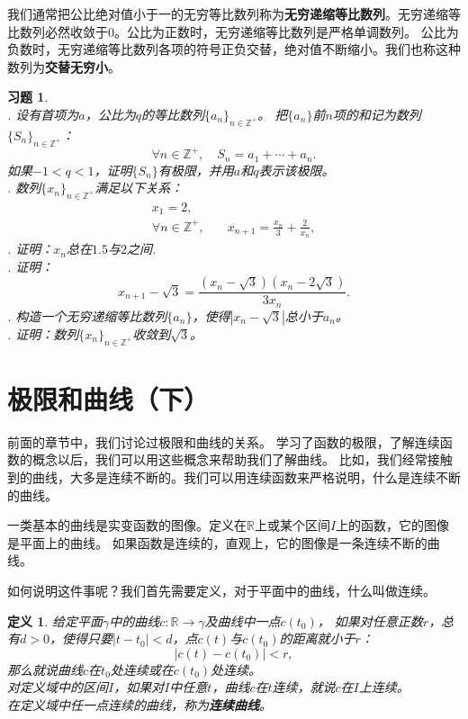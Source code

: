 \documentclass[12pt,UTF8]{ctexbook}
\newtheorem{df}{定义}[section]
\newtheorem{sk}{思考}[section]
\newtheorem{xt}{习题}[section]
\begin{document}
我们通常把公比绝对值小于一的无穷等比数列称为\textbf{无穷递缩等比数列}。无穷递缩等比数列必然收敛于$0$。公比为正数时，无穷递缩等比数列是严格单调数列。
公比为负数时，无穷递缩等比数列各项的符号正负交替，绝对值不断缩小。我们也称这种数列为\textbf{交替无穷小}。

    

\begin{xt}
    \mbox{}\\
    . 设有首项为$a$，公比为$q$的等比数列$\{a_n\}_{n\in\mathbb{Z}^+}$。
    把$\{a_n\}$前$n$项的和记为数列$\{S_n\}_{n\in\mathbb{Z}^+}$：
    $$ \forall n \in \mathbb{Z}^+ , \quad S_n = a_1 + \cdots + a_n. $$
    如果$-1<q<1$，证明$\{S_n\}$有极限，并用$a$和$q$表示该极限。\\
    . 数列$\{x_n\}_{n\in\mathbb{Z}^+}$满足以下关系：
    \begin{align*}
        x_1 = 2, &  \\
        \forall n\in\mathbb{Z}^+, &\quad x_{n+1} = \frac{x_n}{3} + \frac{2}{x_n},
    \end{align*}
    . 证明：$x_n$总在$1.5$与$2$之间.\\
    . 证明：
    $$x_{n+1} - \sqrt{3} = \frac{(x_n - \sqrt{3})(x_n - 2\sqrt{3})}{3x_n}.$$
    . 构造一个无穷递缩等比数列$\{a_n\}$，使得$|x_n - \sqrt{3}|$总小于$a_n$。\\
    . 证明：数列$\{x_n\}_{n\in\mathbb{Z}^+}$收敛到$\sqrt{3}$。
\end{xt}

\section{极限和曲线（下）}
前面的章节中，我们讨论过极限和曲线的关系。
学习了函数的极限，了解连续函数的概念以后，我们可以用这些概念来帮助我们了解曲线。
比如，我们经常接触到的曲线，大多是连续不断的。我们可以用连续函数来严格说明，什么是连续不断的曲线。

一类基本的曲线是实变函数的图像。定义在$\mathbb{R}$上或某个区间$I$上的函数，它的图像是平面上的曲线。
如果函数是连续的，直观上，它的图像是一条连续不断的曲线。

如何说明这件事呢？我们首先需要定义，对于平面中的曲线，什么叫做连续。

\begin{df}
    给定平面$\gamma$中的曲线$c: \mathbb{R} \rightarrow \gamma$及曲线中一点$c(t_0)$，
    如果对任意正数$r$，总有$d>0$，使得只要$|t - t_0| < d$，点$c(t)$与$c(t_0)$的距离就小于$r$：
    $$ |c(t) - c(t_0)| < r,$$
    那么就说曲线$c$在$t_0$处连续或在$c(t_0)$处连续。\\
    对定义域中的区间$I$，如果对$I$中任意$t$，曲线$c$在$t$连续，就说$c$在$I$上连续。\\
    在定义域中任一点连续的曲线，称为\textbf{连续曲线}。
\end{df}
\end{document}
